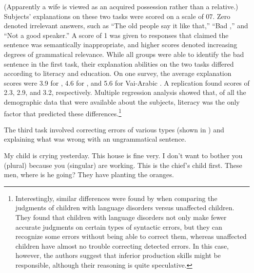    \z

\noindent
(Apparently a wife is viewed as an acquired possession rather than a relative.) Subjects' explanations on these two tasks were scored on a scale of 0\textendash{}7. Zero denoted irrelevant answers, such as ``The old people say it like that,'' ``Bad ,'' and ``Not a good  speaker.'' A score of 1 was given to responses that claimed the sentence was semantically inappropriate, and higher scores denoted increasing degrees of grammatical relevance. While all groups were able to identify the bad sentence in the first task, their explanation abilities on the two tasks differed according to literacy and education. On one survey, the average explanation scores were 3.9 for , 4.6 for  , and 5.6 for Vai-Arabic . A replication found scores of 2.3, 2.9, and 3.2, respectively. Multiple regression analysis showed that, of all the demographic data that were available about the subjects,  literacy was the only factor that predicted these differences.\footnote{Interestingly, similar differences were found by \citet{LilesEtAl1977} when comparing the judgments of children with language disorders versus unaffected children. They found that children with language disorders not only make fewer accurate judgments on certain types of syntactic errors, but they can recognize some errors without being able to correct them, whereas unaffected children have almost no trouble correcting detected errors. In this case, however, the authors suggest that inferior production skills might be responsible, although their reasoning is quite speculative.}


The third task involved correcting errors of various types (shown in ) and explaining what was wrong with an ungrammatical sentence.

\ea\label{ex:4:8}
\ea My child is crying yesterday.
\ex This house is fine very.
\ex I don't want to bother you (plural) because you (singular) are working.
\ex This is the chief's child first.
\ex These men, where is he going?
\ex They have planting the oranges.
\z
\z

